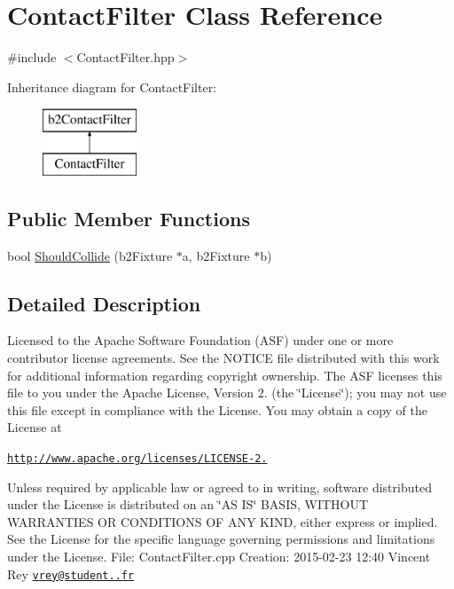 \hypertarget{class_contact_filter}{\section{Contact\+Filter Class Reference}
\label{class_contact_filter}
}


{\ttfamily \#include $<$Contact\+Filter.\+hpp$>$}

Inheritance diagram for Contact\+Filter\+:\begin{figure}[H]
\begin{center}
\leavevmode
\includegraphics[height=2.000000cm]{class_contact_filter}
\end{center}
\end{figure}
\subsection*{Public Member Functions}
\begin{DoxyCompactItemize}
\item 
bool \hyperlink{class_contact_filter_aa1f43a83fda36c0d4e0479e370350585}{Should\+Collide} (b2\+Fixture $\ast$a, b2\+Fixture $\ast$b)
\end{DoxyCompactItemize}


\subsection{Detailed Description}
Licensed to the Apache Software Foundation (A\+S\+F) under one or more contributor license agreements. See the N\+O\+T\+I\+C\+E file distributed with this work for additional information regarding copyright ownership. The A\+S\+F licenses this file to you under the Apache License, Version 2. (the \char`\"{}\+License\char`\"{}); you may not use this file except in compliance with the License. You may obtain a copy of the License at

\href{http://www.apache.org/licenses/LICENSE-2.0}{\tt http\+://www.\+apache.\+org/licenses/\+L\+I\+C\+E\+N\+S\+E-\/2.}

Unless required by applicable law or agreed to in writing, software distributed under the License is distributed on an \char`\"{}\+A\+S I\+S\char`\"{} B\+A\+S\+I\+S, W\+I\+T\+H\+O\+U\+T W\+A\+R\+R\+A\+N\+T\+I\+E\+S O\+R C\+O\+N\+D\+I\+T\+I\+O\+N\+S O\+F A\+N\+Y K\+I\+N\+D, either express or implied. See the License for the specific language governing permissions and limitations under the License. File\+: Contact\+Filter.\+cpp Creation\+: 2015-\/02-\/23 12\+:40 Vincent Rey \href{mailto:vrey@student.42.fr}{\tt vrey@student..\+fr} 


